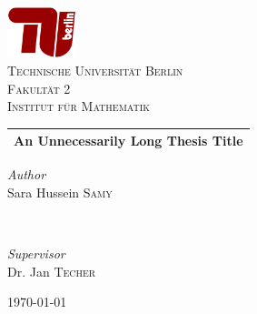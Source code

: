 \documentclass[12pt,a4paper]{article}
\theoremstyle{definition}
\theoremstyle{remark}
\begin{document}
\begin{titlepage}
\newcommand{\HRule}{\rule{\linewidth}{0.5mm}}
\begin{center}

\includegraphics[width=0.15\textwidth]{TU-Berlin-Logo.png}\\[1cm]
\textsc{\LARGE Technische Universität Berlin}\\[1.5cm]
\textsc{\large Fakultät 2}\\[0.5cm]
\textsc{\large Institut für Mathematik}\\[0.5cm]

\setlength{\aboverulesep}{10pt}
\setlength{\belowrulesep}{13pt}
\begin{tabularx}{\textwidth}{ >{\centering\arraybackslash}X}
\midrule[0.5mm]
\huge\bfseries An Unnecessarily Long Thesis Title\\
\midrule[0.5mm]
\end{tabularx}

\begin{minipage}{0.4\textwidth}
    \begin{flushleft}
        \large
        \textit{\textcolor{TUColor}{Author}}\\
        Sara Hussein \textsc{Samy}
    \end{flushleft}
\end{minipage}
~
\begin{minipage}{0.4\textwidth}
    \begin{flushright}
        \large
        \textit{\textcolor{TUColor}{Supervisor}}\\
        Dr. Jan \textsc{Techer}
    \end{flushright}
\end{minipage}

\vspace{260 pt}
{\large\today}
\end{center}
\end{titlepage}


\renewcommand{\contentsname}{Table of contents}
\tableofcontents
\pagebreak
\end{document}
